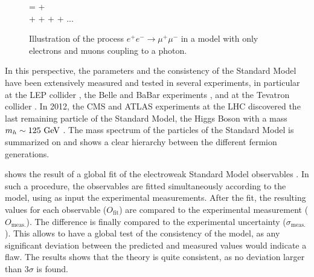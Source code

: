     \begin{figure}
        \centering
        {
            =
            +
            \nonumber
            \\
            +
            +
            +
            +
            ...
            \nonumber
        }
        \caption{Illustration of the process $e^+ e^- \rightarrow \mu^+ \mu^-$
        in a model with only electrons and muons coupling to a photon. \label{fig:perturbativeDevelopment}}
    \end{figure}

    In this perspective, the parameters and the consistency of the Standard
    Model have been extensively measured and tested in several experiments, in
    particular at the LEP collider \cite{LEP}, the Belle and BaBar experiments
    \cite{BelleAndBabar}, and at the Tevatron collider \cite{Tevatron}. In 2012,
    the CMS and ATLAS experiments at the LHC discovered the last remaining
    particle of the Standard Model, the Higgs Boson with a mass $m_{h} \sim
    125~\text{GeV}$ \cite{CMSHiggs,ATLASHiggs}. The mass spectrum of the particles of
    the Standard Model is summarized on  and
    shows a clear hierarchy between the different fermion generations.

     shows the result of a global fit of the
    electroweak Standard Model observables \cite{GFitter}. In such a procedure,
    the observables are fitted simultaneously according to the model, using as
    input the experimental measurements.  After the fit, the resulting values
    for each observable ($O_\text{fit}$) are compared to the experimental
    measurement ($O_\text{meas.}$). The difference is finally compared to the
    experimental uncertainty ($\sigma_\text{meas.}$). This allows to have a
    global test of the consistency of the model, as any significant deviation
    between the predicted and measured values would indicate a flaw. The results
    shows that the theory is quite consistent, as no deviation larger than
    3$\sigma$ is found.

